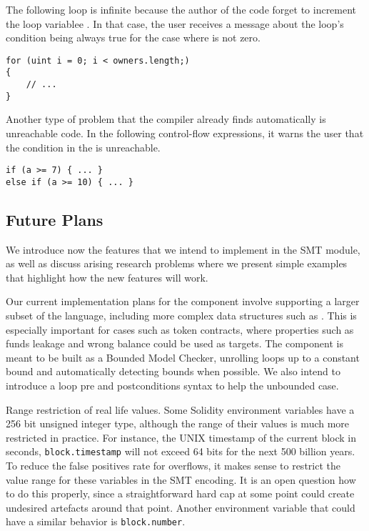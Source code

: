 The following loop is infinite because the author of the code
forget to increment the loop variablee .
%
In that case, the user receives a message about the loop's condition being
always true for the case where  is not zero.

\begin{verbatim}
for (uint i = 0; i < owners.length;)
{
    // ...
}
\end{verbatim}

Another type of problem that the compiler already finds automatically is
unreachable code.
%
In the following control-flow expressions, it warns the user that the condition
in the  is unreachable.

\begin{verbatim}
if (a >= 7) { ... }
else if (a >= 10) { ... }
\end{verbatim}


\subsection{Future Plans}

We introduce now the features that we intend to implement in the SMT module, as
well as discuss arising research problems where we present simple examples that
highlight how the new features will work.

Our current implementation plans for the component involve supporting
a larger subset of the language, including more complex data structures
such as .
%
This is especially important for cases such as token contracts, where
properties such as funds leakage and wrong balance could be used as targets.
%
The component is meant to be built as a Bounded Model Checker, unrolling loops
up to a constant bound and automatically detecting bounds when possible.
%
We also intend to introduce a loop pre and postconditions syntax to help the
unbounded case.

\begin{paragraph}{Range restriction of real life values.}
Some Solidity environment variables have a 256 bit unsigned integer type,
although the range of their values is much more restricted in practice.
For instance, the UNIX timestamp of the current block in seconds,
\texttt{block.timestamp} will not exceed 64 bits for the next
500 billion years. To reduce the false positives rate for
overflows, it makes sense to restrict the value range for these
variables in the SMT encoding. It is an open question how to do
this properly, since a straightforward hard cap at some point
could create undesired artefacts around that point.
%
Another environment variable that could have a similar
behavior is \texttt{block.number}.
\end{paragraph}

